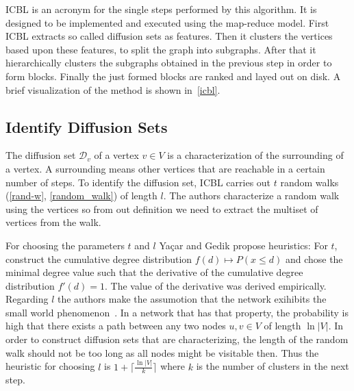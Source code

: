     ICBL is an acronym for the single steps performed by this algorithm. 
    It is designed to be implemented and executed using the map-reduce model.
    First ICBL extracts so called diffusion sets as features.
    Then it clusters the vertices based upon these features, to split the graph into subgraphs.
    After that it hierarchically clusters the subgraphs obtained in the previous step in order to form blocks.
    Finally the just formed blocks are ranked and layed out on disk.
    A brief visualization of the method is shown in~\ref{icbl}.
    
    \subsection{Identify Diffusion Sets}\label{\positionnumber}
    The diffusion set $\mathcal{D}_v$ of a vertex $v \in V$ is a characterization of the surrounding of a vertex. 
    A surrounding means other vertices that are reachable in a certain number of steps.
    To identify the diffusion set, ICBL carries out $t$ random walks (\ref{rand-w}, \ref{random_walk}) of length $l$.
    The authors characterize a random walk using the vertices so from out definition we need to extract the multiset of vertices from the walk.
    
    For choosing the parameters $t$ and $l$ Ya\c{c}ar and Gedik propose heuristics: 
    For $t$, construct the cumulative degree distribution $f(d) \mapsto P(x \leq d)$ and chose the minimal degree value such that the derivative of the cumulative degree distribution $f'(d) = 1$. The value of the derivative was derived empirically.
    Regarding $l$ the authors make the assumotion that the network exihibits the small world phenomenon~\autocite{kleinberg2000small}.
    In a network that has that property, the probability is high that there exists a path between any two nodes $u,v \in V$ of length $\ln{|V|}$.
    In order to construct diffusion sets that are characterizing, the length of the random walk should not be too long as all nodes might be visitable then. Thus the heuristic for choosing $l$ is $1 + \lceil \frac{\ln |V|}{k} \rceil$ where $k$ is the number of clusters in the next step.
    
